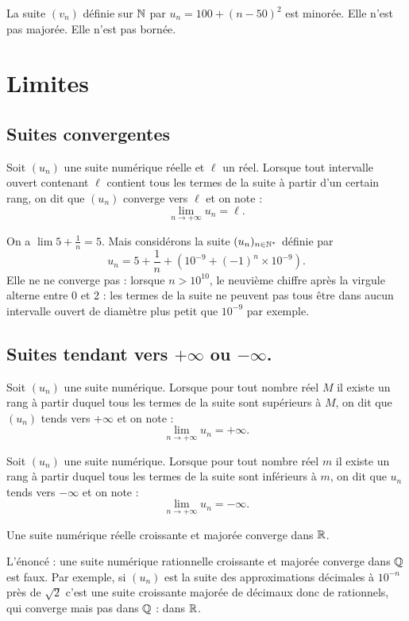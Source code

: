 \documentclass[a4paper,11pt,DIV14,BCOR0mm]{scrartcl}
\begin{document}
\begin{exemple}
 La suite $(v_n)$ définie sur $\mathbb{N}$ par $u_n=100+(n-50)^2$ est minorée. Elle n'est pas majorée.
Elle n'est pas bornée.
\end{exemple}

\pagebreak
\section{Limites}
\subsection{Suites convergentes}
\begin{definition}
 Soit $(u_n)$ une suite numérique réelle et $\ell$ un réel. Lorsque tout intervalle ouvert contenant $\ell$
contient tous les termes de la suite à partir d'un certain rang, on dit que $(u_n)$ converge vers $\ell$ et
on note :
\[
 \lim_{n\to+\infty}u_n=\ell.
\]
\end{definition}
\begin{exemple}
 On a $
 \lim 5+\frac{1}{n}=5.
$
Mais considérons la suite $(u_n)_{n\in\mathbb{N}^*}$ définie par \[
 u_n=5+\frac{1}{n}+(10^{-9}+(-1)^n\times 10^{-9}).
\]
Elle ne ne converge pas : lorsque $n> 10^{10}$, le neuvième chiffre après la virgule alterne entre
0 et 2 : les termes de la suite ne peuvent pas tous être dans aucun intervalle ouvert
de diamètre plus petit que $10^{-9}$ par exemple.
\end{exemple}


\subsection{Suites tendant vers $+\infty$ ou $-\infty$.}
\begin{definition}
 Soit $(u_n)$ une suite numérique. Lorsque pour tout nombre réel $M$ il existe un rang à partir duquel 
tous les termes de la suite sont supérieurs
à $M$, on dit que $(u_n)$ tends vers $+\infty$ et on note :
\[
 \lim_{n\to+\infty}u_n=+\infty.
\]
\end{definition}

\begin{definition}
 Soit $(u_n)$ une suite numérique. Lorsque pour tout nombre réel $m$ il existe un rang à 
partir duquel tous les termes de la suite sont inférieurs
à $m$, on dit que $u_n$ tends vers $-\infty$ et on note :
\[
 \lim_{n\to+\infty}u_n=-\infty.
\]
\end{definition}

\begin{theoreme}
Une suite numérique réelle croissante et majorée converge dans $\mathbb{R}$.
\end{theoreme}
\begin{remarque}
 L'énoncé : \og une suite numérique rationnelle croissante et majorée converge dans $\mathbb{Q}$\fg{} est
faux. Par exemple, si $(u_n)$ est la suite des approximations décimales à $10^{-n}$ près de
$\sqrt{2}$ c'est une suite croissante majorée de décimaux donc de rationnels, qui converge mais pas
dans $\mathbb{Q}$ : dans $\mathbb{R}$.
\end{remarque}
\end{document}
